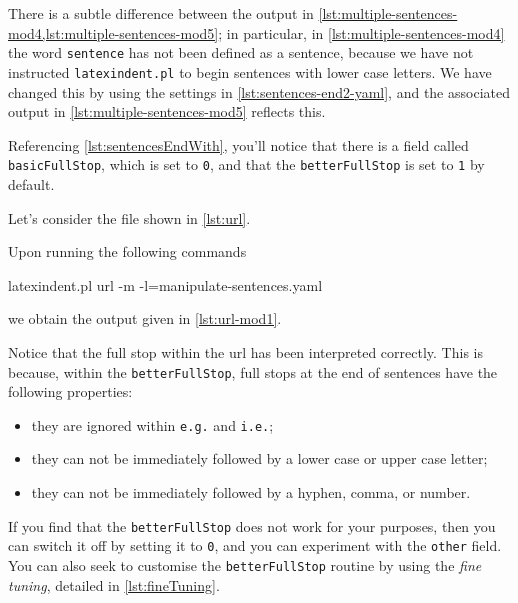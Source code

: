  There is a subtle difference between the output in
 \cref{lst:multiple-sentences-mod4,lst:multiple-sentences-mod5}; in particular, in
 \cref{lst:multiple-sentences-mod4} the word \texttt{sentence} has not been defined as a
 sentence, because we have not instructed \texttt{latexindent.pl} to begin sentences with
 lower case letters. We have changed this by using the settings in
 \cref{lst:sentences-end2-yaml}, and the associated output in
 \cref{lst:multiple-sentences-mod5} reflects this.

 Referencing \vref{lst:sentencesEndWith}, you'll notice that there is a field called
 \texttt{basicFullStop}, which is set to \texttt{0}, and that the \texttt{betterFullStop}
 is set to \texttt{1} by default.

 Let's consider the file shown in \cref{lst:url}.


 Upon running the following commands  
 \begin{commandshell}
latexindent.pl url -m -l=manipulate-sentences.yaml
\end{commandshell}
 we obtain the output given in \cref{lst:url-mod1}.


 Notice that the full stop within the url has been interpreted correctly. This is because,
 within the \texttt{betterFullStop}, full stops at the end of sentences have the following
 properties:
 \begin{itemize}
  \item they are ignored within \texttt{e.g.} and \texttt{i.e.};
  \item they can not be immediately followed by a lower case or upper case letter;
  \item they can not be immediately followed by a hyphen, comma, or number.
 \end{itemize}
 If you find that the \texttt{betterFullStop} does not work for your purposes, then you
 can switch it off by setting it to \texttt{0}, and you can experiment with the
 \texttt{other} field.  You can also
 seek to customise the \texttt{betterFullStop} routine by using the \emph{fine tuning},
 detailed in \vref{lst:fineTuning}.%

